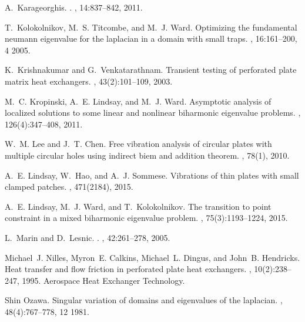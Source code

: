 \documentclass[times]{article}
\begin{document}
\begin{thebibliography}{10}
A.~Karageorghis.
.
, 14:837--842, 2011.

T.~Kolokolnikov, M.~S. Titcombe, and M.~J. Ward.
\newblock Optimizing the fundamental neumann eigenvalue for the laplacian in a
  domain with small traps.
, 16:161--200, 4 2005.

K.~Krishnakumar and G.~Venkatarathnam.
\newblock Transient testing of perforated plate matrix heat exchangers.
, 43(2):101--109, 2003.

M.~C. Kropinski, A.~E. Lindsay, and M.~J. Ward.
\newblock Asymptotic analysis of localized solutions to some linear and
  nonlinear biharmonic eigenvalue problems.
, 126(4):347--408, 2011.

W.~M. Lee and J.~T. Chen.
\newblock Free vibration analysis of circular plates with multiple circular
  holes using indirect biem and addition theorem.
, 78(1), 2010.

A.~E. Lindsay, W.~Hao, and A.~J. Sommese.
\newblock Vibrations of thin plates with small clamped patches.
, 471(2184), 2015.

A.~E. Lindsay, M.~J. Ward, and T.~Kolokolnikov.
\newblock The transition to point constraint in a mixed biharmonic eigenvalue
  problem.
, 75(3):1193--1224, 2015.

L.~Marin and D.~Lesnic.
.
, 42:261--278, 2005.

Michael~J. Nilles, Myron~E. Calkins, Michael~L. Dingus, and John~B. Hendricks.
\newblock Heat transfer and flow friction in perforated plate heat exchangers.
, 10(2):238--247, 1995.
\newblock Aerospace Heat Exchanger Technology.

Shin Ozawa.
\newblock Singular variation of domains and eigenvalues of the laplacian.
, 48(4):767--778, 12 1981.


\end{thebibliography}
\end{document}

